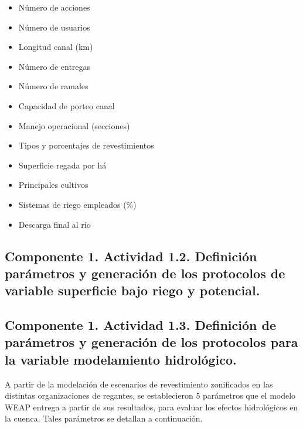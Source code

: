 \documentclass[]{article}
\begin{document}
\begin{itemize}
\item Número de acciones
\item Número de usuarios
\item Longitud canal (km)
\item Número de entregas
\item Número de ramales
\item Capacidad de porteo canal
\item Manejo operacional (secciones)
\item Tipos y porcentajes de revestimientos
\item Superficie regada por há
\item Principales cultivos
\item Sistemas de riego empleados (\%)
\item Descarga final al río
\end{itemize}

\subsection{Componente 1. Actividad 1.2. Definición parámetros y generación de los protocolos de variable superficie bajo riego y potencial.}

\subsection{Componente 1. Actividad 1.3. Definición de parámetros y generación de los protocolos para la variable modelamiento hidrológico.}

A partir de la modelación de escenarios de revestimiento zonificados en las distintas organizaciones de regantes, se establecieron 5 parámetros que el modelo WEAP entrega a partir de sus resultados, para evaluar los efectos hidrológicos en la cuenca. Tales parámetros se detallan a continuación.
\end{document}
